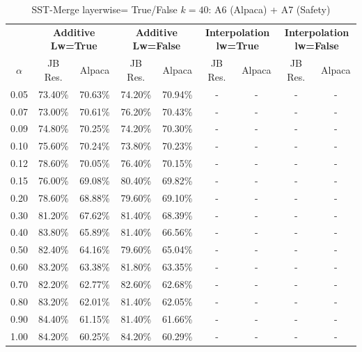 \begin{table}[h]
\centering
\caption{SST-Merge layerwise= True/False $k=40$: A6 (Alpaca) + A7 (Safety)}
\label{tab:res_a6_sst_merge_40}
\begin{tabular}{c|cc|cc|cc|cc}
\hline
 & \multicolumn{2}{c|}{\textbf{Additive Lw=True}} & \multicolumn{2}{c|}{\textbf{Additive Lw=False}} & \multicolumn{2}{c|}{\textbf{Interpolation lw=True}}& \multicolumn{2}{c}{\textbf{Interpolation lw=False}} \\
$\alpha$ & JB Res. & Alpaca & JB Res. & Alpaca & JB Res. & Alpaca & JB Res. & Alpaca \\
\hline
0.05 & 73.40\% & 70.63\% & 74.20\% & 70.94\% & - & - & - & - \\
0.07 & 73.00\% & 70.61\% & 76.20\% & 70.43\% & - & - & - & - \\
0.09 & 74.80\% & 70.25\% & 74.20\% & 70.30\% & - & - & - & - \\
0.10 & 75.60\% & 70.24\% & 73.80\% & 70.23\% & - & - & - & - \\
0.12 & 78.60\% & 70.05\% & 76.40\% & 70.15\% & - & - & - & - \\
0.15 & 76.00\% & 69.08\% & 80.40\% & 69.82\% & - & - & - & - \\
0.20 & 78.60\% & 68.88\% & 79.60\% & 69.10\% & - & - & - & - \\
0.30 & 81.20\% & 67.62\% & 81.40\% & 68.39\% & - & - & - & - \\
0.40 & 83.80\% & 65.89\% & 81.40\% & 66.56\% & - & - & - & - \\
0.50 & 82.40\% & 64.16\% & 79.60\% & 65.04\% & - & - & - & - \\
0.60 & 83.20\% & 63.38\% & 81.80\% & 63.35\% & - & - & - & - \\
0.70 & 82.20\% & 62.77\% & 82.60\% & 62.68\% & - & - & - & - \\
0.80 & 83.20\% & 62.01\% & 81.40\% & 62.05\% & - & - & - & - \\
0.90 & 84.40\% & 61.15\% & 81.40\% & 61.66\% & - & - & - & - \\
1.00 & 84.20\% & 60.25\% & 84.20\% & 60.29\% & - & - & - & - \\
\hline
\end{tabular}
\end{table}
\FloatBarrier


